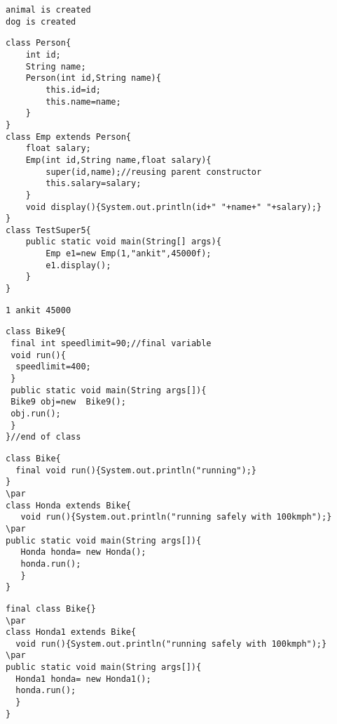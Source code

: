 \documentclass{book}
\def\lthtmlcheckvsize{\ifdim\ht\sizebox<\vsize 
  \ifdim\wd\sizebox<\hsize\expandafter\hfill\fi \expandafter\vfill
  \else\expandafter\vss\fi}%
\begin{document}
{\newpage\clearpage
{}%
\begin{lstlisting}
animal is created
dog is created
\end{lstlisting}%
\lthtmlfigureZ
\lthtmlcheckvsize\clearpage}

{\newpage\clearpage
{}%
\begin{lstlisting}
class Person{  
	int id;  
	String name;  
	Person(int id,String name){  
		this.id=id;  
		this.name=name;  
	}  
}  
class Emp extends Person{  
	float salary;  
	Emp(int id,String name,float salary){  
		super(id,name);//reusing parent constructor  
		this.salary=salary;  
	}  
	void display(){System.out.println(id+" "+name+" "+salary);}  
}  
class TestSuper5{  
	public static void main(String[] args){  
		Emp e1=new Emp(1,"ankit",45000f);  
		e1.display();  
	}
}  
\end{lstlisting}%
\lthtmlfigureZ
\lthtmlcheckvsize\clearpage}

{\newpage\clearpage
{}%
\begin{lstlisting}
1 ankit 45000
\end{lstlisting}%
\lthtmlfigureZ
\lthtmlcheckvsize\clearpage}

{\newpage\clearpage
{}%
\begin{lstlisting}
class Bike9{  
 final int speedlimit=90;//final variable  
 void run(){  
  speedlimit=400;  
 }  
 public static void main(String args[]){  
 Bike9 obj=new  Bike9();  
 obj.run();  
 }  
}//end of class  
\end{lstlisting}%
\lthtmlfigureZ
\lthtmlcheckvsize\clearpage}

{\newpage\clearpage
{}%
\begin{lstlisting}
class Bike{  
  final void run(){System.out.println("running");}  
}  
\par
class Honda extends Bike{  
   void run(){System.out.println("running safely with 100kmph");}  
\par
public static void main(String args[]){  
   Honda honda= new Honda();  
   honda.run();  
   }  
}  
\end{lstlisting}%
\lthtmlfigureZ
\lthtmlcheckvsize\clearpage}

{\newpage\clearpage
{}%
\begin{lstlisting}
final class Bike{}  
\par
class Honda1 extends Bike{  
  void run(){System.out.println("running safely with 100kmph");}  
\par
public static void main(String args[]){  
  Honda1 honda= new Honda1();  
  honda.run();  
  }  
}  
\end{lstlisting}%
\lthtmlfigureZ
\lthtmlcheckvsize\clearpage}
\end{document}
